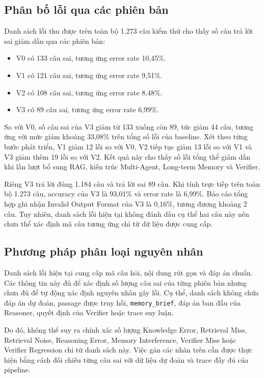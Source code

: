 \subsection{Phân bố lỗi qua các phiên bản}

\noindent
Danh sách lỗi thu được trên toàn bộ 1.273 câu kiểm thử cho thấy số
câu trả lời sai giảm dần qua các phiên bản:

\begin{itemize}
    \item V0 có 133 câu sai, tương ứng error rate 10,45\%.
    \item V1 có 121 câu sai, tương ứng error rate 9,51\%.
    \item V2 có 108 câu sai, tương ứng error rate 8,48\%.
    \item V3 có 89 câu sai, tương ứng error rate 6,99\%.
\end{itemize}

\noindent
So với V0, số câu sai của V3 giảm từ 133 xuống còn 89, tức giảm
44 câu, tương ứng với mức giảm khoảng 33,08\% trên tổng số lỗi của
baseline. Xét theo từng bước phát triển, V1 giảm 12 lỗi so với V0,
V2 tiếp tục giảm 13 lỗi so với V1 và V3 giảm thêm 19 lỗi so với V2.
Kết quả này cho thấy số lỗi tổng thể giảm dần khi lần lượt bổ sung
RAG, kiến trúc Multi-Agent, Long-term Memory và Verifier.

\noindent
Riêng V3 trả lời đúng 1.184 câu và trả lời sai 89 câu. Khi tính trực
tiếp trên toàn bộ 1.273 câu, accuracy của V3 là 93,01\% và error rate
là 6,99\%. Báo cáo tổng hợp ghi nhận Invalid Output Format của V3 là
0,16\%, tương đương khoảng 2 câu. Tuy nhiên, danh sách lỗi hiện tại
không đánh dấu cụ thể hai câu này nên chưa thể xác định mã câu tương
ứng chỉ từ dữ liệu được cung cấp.

\subsection{Phương pháp phân loại nguyên nhân}

\noindent
Danh sách lỗi hiện tại cung cấp mã câu hỏi, nội dung rút gọn và đáp
án chuẩn. Các thông tin này đủ để xác định số lượng câu sai của từng
phiên bản nhưng chưa đủ để tự động xác định nguyên nhân gây lỗi.
Cụ thể, danh sách không chứa đáp án dự đoán, passage được truy hồi,
\texttt{memory\_brief}, đáp án ban đầu của Reasoner, quyết định của
Verifier hoặc trace suy luận.

Do đó, không thể suy ra chính xác số lượng Knowledge Error,
Retrieval Miss, Retrieval Noise, Reasoning Error, Memory Interference,
Verifier Miss hoặc Verifier Regression chỉ từ danh sách này. Việc
gán các nhãn trên cần được thực hiện bằng cách đối chiếu từng câu sai
với dữ liệu dự đoán và trace đầy đủ của pipeline.


